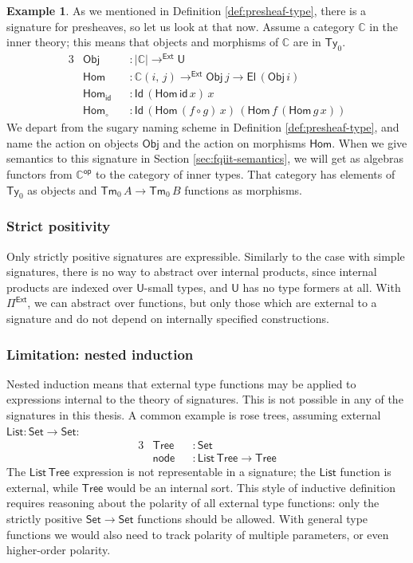 \documentclass[12pt,a4paper,twoside,openany]{book}
\theoremstyle{remark}
\theoremstyle{definition}
\newtheorem{myexample}{Example}
\theoremstyle{theorem}
\newcommand{\ms}[1]{\mathsf{#1}}
\newcommand{\mbb}[1]{\mathbb{#1}}
\newcommand{\id}{\mathsf{id}}
\newcommand{\Tm}{\mathsf{Tm}}
\newcommand{\Ty}{\mathsf{Ty}}
\newcommand{\U}{\mathsf{U}}
\newcommand{\El}{\mathsf{El}}
\newcommand{\Id}{\mathsf{Id}}
\newcommand{\Set}{\mathsf{Set}}
\newcommand{\Pie}{\Pi^{\mathsf{Ext}}}
\newcommand{\toe}{\to^{\ms{Ext}}}
\newcommand{\mbbC}{\mbb{C}}
\begin{document}
\begin{myexample}
\label{ex:presheaf-sig}
As we mentioned in Definition \ref{def:presheaf-type}, there is a signature for
presheaves, so let us look at that now. Assume a category $\mbbC$ in the inner
theory; this means that objects and morphisms of $\mbbC$ are in $\Ty_0$.
\begin{alignat*}{3}
  & \ms{Obj}         &&: |\mbbC| \toe \U\\
  & \ms{Hom}         &&: \mbbC(i,\,j) \toe \ms{Obj}\,j \to \El\,(\ms{Obj}\,i)\\
  & \ms{Hom_{\ms{id}}} &&: \Id\,(\ms{Hom}\,\id\,x)\,x\\
  & \ms{Hom_{\circ}}  &&: \Id\,(\ms{Hom}\,(f \circ g)\,x)\,(\ms{Hom}\,f\,(\ms{Hom}\,g\,x))
\end{alignat*}
We depart from the sugary naming scheme in Definition \ref{def:presheaf-type},
and name the action on objects $\ms{Obj}$ and the action on morphisms
$\ms{Hom}$. When we give semantics to this signature in Section \ref{sec:fqiit-semantics}, we
will get as algebras functors from $\mbbC^{\ms{op}}$ to the category of inner
types. That category has elements of $\Ty_0$ as objects and $\Tm_0\,A \to
\Tm_0\,B$ functions as morphisms.
\end{myexample}

\subsubsection{Strict positivity}

Only strictly positive signatures are expressible. Similarly to the case with
simple signatures, there is no way to abstract over internal products, since
internal products are indexed over $\U$-small types, and $\U$ has no type
formers at all. With $\Pie$, we can abstract over functions, but only those
which are external to a signature and do not depend on internally specified
constructions.


\subsubsection{Limitation: nested induction}

Nested induction means that external type functions may be applied to
expressions internal to the theory of signatures. This is not possible in any of
the signatures in this thesis. A common example is rose trees, assuming
external $\ms{List} : \Set \to \Set$:
\begin{alignat*}{3}
  &\ms{Tree} &&: \Set\\
  &\ms{node} &&: \ms{List}\,\ms{Tree} \to \ms{Tree}
\end{alignat*}
The $\ms{List}\,\ms{Tree}$ expression is not representable in a signature; the
$\ms{List}$ function is external, while $\ms{Tree}$ would be an internal sort.
This style of inductive definition requires reasoning about the polarity of all
external type functions: only the strictly positive $\Set \to \Set$ functions
should be allowed. With general type functions we would also need to track
polarity of multiple parameters, or even higher-order polarity.
\end{document}
